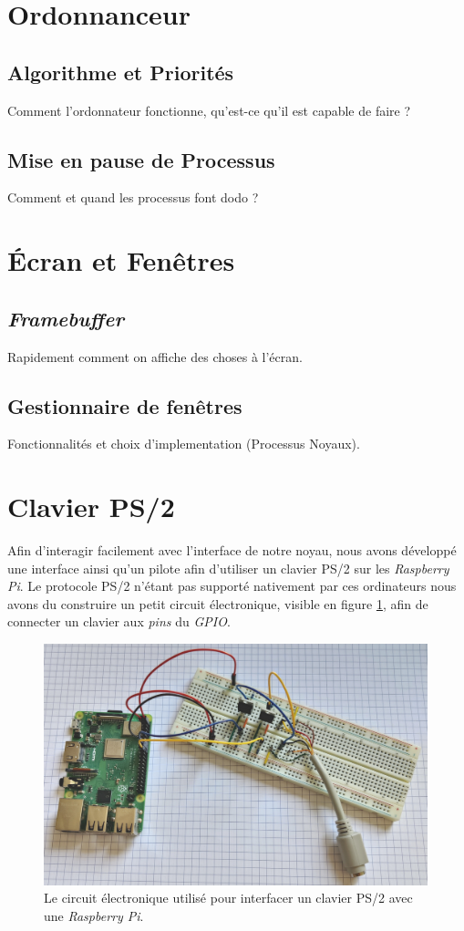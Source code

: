 \documentclass[french, 12pt]{article}
\newcommand{\rpi}{\emph{Raspberry Pi}}
\begin{document}
\section{Ordonnanceur}
\subsection{Algorithme et Priorités}
Comment l'ordonnateur fonctionne, qu'est-ce qu'il est capable de faire ?

\subsection{Mise en pause de Processus}
Comment et quand les processus font dodo ?

\section{Écran et Fenêtres}
\subsection{\textit{Framebuffer}}
Rapidement comment on affiche des choses à l'écran.

\subsection{Gestionnaire de fenêtres}
Fonctionnalités et choix d'implementation (Processus Noyaux).

\section{Clavier PS/2}
Afin d'interagir facilement avec l'interface de notre noyau, nous avons
développé une interface ainsi qu'un pilote afin d'utiliser un clavier PS/2 sur
les \rpi{}. Le protocole PS/2 n'étant pas supporté nativement par ces
ordinateurs nous avons du construire un petit circuit électronique, visible en
figure \ref{img:ps2-cables}, afin de connecter un clavier aux \textit{pins} du
\textit{GPIO}.

\begin{figure}[htp]
    \begin{center}
        \includegraphics[height=7cm]{ps2-cables.jpg}
    \end{center}
    \caption{Le circuit électronique utilisé pour interfacer un clavier PS/2
        avec une \rpi{}.}
    \label{img:ps2-cables}
\end{figure}
\end{document}
